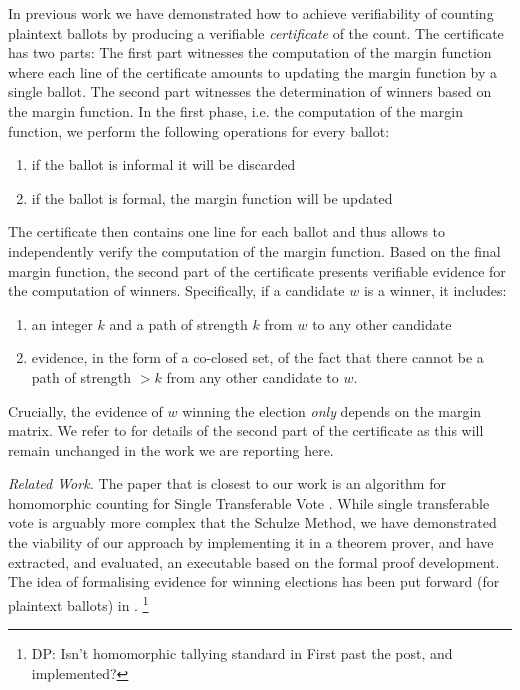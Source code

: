 \documentclass{llncs}
\begin{document}
  In previous work \cite{Pattinson:2017:SVE} we have demonstrated
  how to achieve verifiability of counting plaintext ballots by
  producing a verifiable \emph{certificate} of the count. The
  certificate has two parts: The first part witnesses the
  computation of the margin function where each line of the
  certificate amounts to updating the margin function by a single
  ballot. The second part witnesses the determination of winners
  based on the margin function. In the first phase, i.e. the
  computation of the margin function, we perform the following
  operations for every ballot:
  \begin{enumerate}
    \item if the ballot is informal it will be discarded
    \item if the ballot is formal, the margin function will be
    updated
  \end{enumerate}
  The certificate then contains one line for each ballot and thus
  allows to independently verify the computation of the margin
  function. Based on the final margin function, the second part of
  the certificate presents verifiable evidence for the computation
  of winners. Specifically, if a candidate $w$ is a winner, it
  includes:
  \begin{enumerate}
    \item an integer $k$ and a path of strength $k$ from $w$ to any
    other candidate
    \item evidence, in the form of a co-closed set, of the fact that
    there cannot be a path of strength $> k$ from any other
    candidate to $w$.
  \end{enumerate}
  Crucially, the evidence of $w$ winning the election \emph{only}
  depends on the margin matrix. 
  We refer to \cite{Pattinson:2017:SVE} for details of the second
  part of the certificate as this will remain unchanged in the work
  we are reporting here.
    
   
\smallskip\noindent\emph{Related Work.} The paper that is closest to
our work is an algorithm for homomorphic counting for Single
Transferable Vote \cite{Benaloh:2009:SSC}. While single transferable
vote is arguably more complex that the Schulze Method, we have
demonstrated the viability of our approach by implementing it in a
theorem prover, and have extracted, and evaluated, an executable
based on the formal proof development. The idea of formalising
evidence for winning elections has been put forward (for plaintext
ballots) in \cite{Pattinson:2015:VCM}. 
\footnote{DP: Isn't homomorphic tallying standard in First past the
post, and implemented?}
\end{document}
